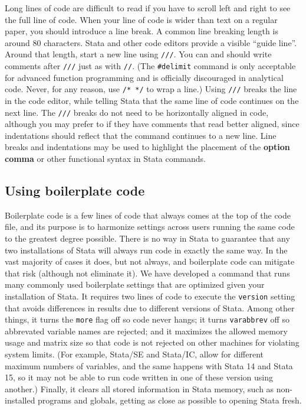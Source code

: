 Long lines of code are difficult to read if you have to scroll left and right to see the full line of code.
When your line of code is wider than text on a regular paper, you should introduce a line break.
A common line breaking length is around 80 characters.
Stata and other code editors provide a visible ``guide line''.
Around that length, start a new line using \texttt{///}.
You can and should write comments after \texttt{///} just as with \texttt{//}.
(The \texttt{\#delimit} command is only acceptable for advanced function programming
and is officially discouraged in analytical code.\cite{cox2005styleguide}
Never, for any reason, use \texttt{/* */} to wrap a line.)
Using \texttt{///} breaks the line in the code editor,
while telling Stata that the same line of code continues on the next line.
The \texttt{///} breaks do not need to be horizontally aligned in code,
although you may prefer to if they have comments that read better aligned,
since indentations should reflect that the command continues to a new line.
Line breaks and indentations may be used to highlight the placement
of the \textbf{option comma} or other functional syntax in Stata commands.


\subsection{Using boilerplate code}

Boilerplate code is a few lines of code that always comes at the top of the code file,
and its purpose is to harmonize settings across users running the same code to the greatest degree possible. There is no way in Stata to guarantee that any two installations of Stata
will always run code in exactly the same way.
In the vast majority of cases it does, but not always,
and boilerplate code can mitigate that risk (although not eliminate it).
We have developed a command that runs many commonly used boilerplate settings
that are optimized given your installation of Stata.
It requires two lines of code to execute the \texttt{version}
setting that avoids differences in results due to different versions of Stata.
Among other things, it turns the \texttt{more} flag off so code never hangs;
it turns \texttt{varabbrev} off so abbrevated variable names are rejected;
and it maximizes the allowed memory usage and matrix size
so that code is not rejected on other machines for violating system limits.
(For example, Stata/SE and Stata/IC, allow for different maximum numbers of variables,
and the same happens with Stata 14 and Stata 15,
so it may not be able to run code written in one of these version using another.)
Finally, it clears all stored information in Stata memory,
such as non-installed programs and globals,
getting as close as possible to opening Stata fresh.

